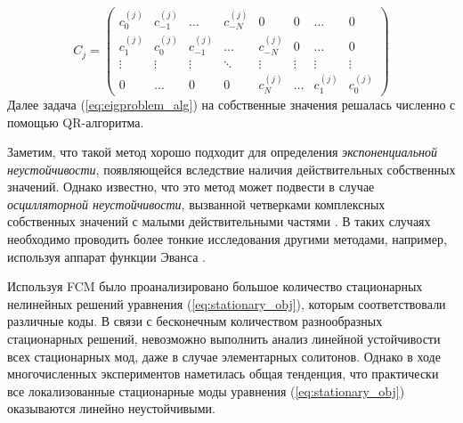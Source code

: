 %
\begin{equation}
C_j = 
\begin{pmatrix}
c_0^{(j)} & c_{-1}^{(j)} & \dots & c_{-N}^{(j)} & 0 & 0 & \dots & 0 \\
c_1^{(j)} & c_0^{(j)} & c_{-1}^{(j)} & \dots & c_{-N}^{(j)} & 0 & \dots & 0 \\
\vdots & \vdots & \vdots & \ddots & \vdots & \vdots & \vdots & \vdots \\
0 &\dots & 0 & 0 & c_N^{(j)} & \dots & c_1^{(j)} & c_0^{(j)}
\end{pmatrix}
\end{equation}
%
Далее задача (\ref{eq:eigproblem_alg}) на собственные значения решалась численно с помощью QR-алгоритма.

Заметим, что такой метод хорошо подходит для определения {\it экспоненциальной неустойчивости}, появляющейся вследствие наличия действительных  собственных значений.
Однако известно, что это метод может подвести в случае {\it осцилляторной неустойчивости}, вызванной четверками комплексных собственных значений с малыми действительными частями \cite{Kizin}.
В таких случаях необходимо проводить более тонкие исследования другими методами, например, используя аппарат функции Эванса \cite{Pelinovsky}.

Используя FCM было проанализировано большое количество стационарных нелинейных решений уравнения (\ref{eq:stationary_obj}), которым соответствовали различные коды.
В связи с бесконечным количеством разнообразных стационарных решений, невозможно выполнить анализ линейной устойчивости всех стационарных мод, даже в случае элементарных солитонов.
Однако в ходе многочисленных экспериментов наметилась общая тенденция, что практически все локализованные стационарные моды уравнения (\ref{eq:stationary_obj}) оказываются линейно неустойчивыми.

